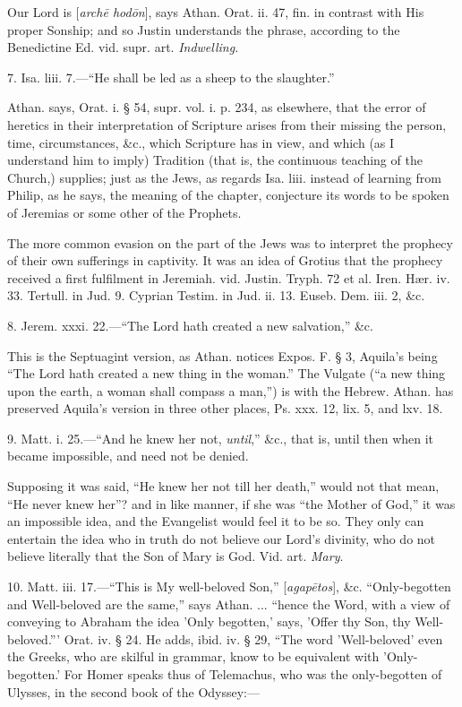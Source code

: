 Our Lord is [\emph{arch\={e} hod\={o}n}],
says Athan. Orat. ii. 47, fin. in contrast with His proper Sonship;
and so Justin understands the phrase, according to the Benedictine Ed.
vid. supr. art. \emph{Indwelling}.

7. Isa. liii. 7.—``He shall be led as a sheep to
the slaughter.''

Athan. says, Orat. i. § 54, supr. vol. i. p.
234, as elsewhere, that the error of heretics in their interpretation
of Scripture arises from their missing the person, time,
circumstances, \&c., which Scripture has in view, and which (as I
understand him to imply) Tradition (that is, the continuous teaching
of the Church,) supplies; just as the Jews, as regards Isa. liii.
instead of learning from Philip, as he says, the meaning of the
chapter, conjecture its words to be spoken of Jeremias or some other
of the Prophets.

The more common evasion on the part of the Jews
was to interpret the prophecy of their own sufferings in captivity. It
was an idea of Grotius that the prophecy received a first fulfilment
in Jeremiah. vid. Justin. Tryph. 72 et al. Iren. Hær. iv. 33. Tertull.
in Jud. 9. Cyprian Testim. in Jud. ii. 13. Euseb. Dem. iii. 2, \&c.

8. Jerem. xxxi. 22.—``The Lord hath created a
new salvation,'' \&c.

This is the Septuagint version, as Athan. notices
Expos. F. § 3, Aquila's being ``The Lord hath created a new thing in
the woman.'' The Vulgate (``a new thing upon the earth, a woman shall
compass a man,'') is with the Hebrew. Athan. has preserved Aquila's
version in three other places, Ps. xxx. 12, lix. 5, and lxv. 18.

9. Matt. i. 25.—``And he knew her not, \emph{until},''
\&c., that is, until then when it became impossible, and need not
be denied.

Supposing it was said, ``He knew her not till her
death,'' would not that mean, ``He never knew her''? and in like manner,
if she was ``the Mother of God,'' it was an impossible idea, and the
Evangelist would feel it to be so. They only can entertain the idea
who in truth do not believe our Lord's divinity, who do not believe
literally that the Son of Mary is God. Vid. art. \emph{Mary}.

10. Matt. iii. 17.—``This is My well-beloved
Son,'' [\emph{agap\={e}tos}], \&c. ``Only-begotten and
Well-beloved are the same,'' says Athan. ... ``hence the Word, with a
view of conveying to Abraham the idea 'Only begotten,' says, 'Offer
thy Son, thy Well-beloved.''' Orat. iv. § 24. He adds, ibid. iv. §
29, ``The word 'Well-beloved' even the Greeks, who are skilful in
grammar, know to be equivalent with 'Only-begotten.' For Homer speaks
thus of Telemachus, who was the only-begotten of Ulysses, in the
second book of the Odyssey:—

